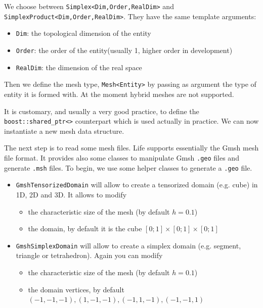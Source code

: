 \documentclass[11pt]{article}
\begin{document}
We choose between \lstinline!Simplex<Dim,Order,RealDim>!  and
\lstinline!SimplexProduct<Dim,Order,RealDim>!. They have the same
template arguments:
\begin{itemize}
\item \lstinline!Dim!: the topological dimension of the entity
\item \lstinline!Order!: the order of the entity(usually 1, higher order in development)
\item \lstinline!RealDim!: the dimension of the real space
\end{itemize}




Then we define the mesh type, \lstinline!Mesh<Entity>! by passing as
argument the type of entity it is formed with. At the moment hybrid
meshes are not supported.



It is customary, and usually a very good practice, to define the
\lstinline!boost::shared_ptr<>!  counterpart which is used actually in
practice. We can now instantiate a new mesh data structure.



The next step is to read some mesh files. Life supports essentially
the Gmsh mesh file format. It provides also some classes to manipulate
Gmsh \lstinline!.geo! files and generate \lstinline!.msh! files. To
begin, we use some helper classes to generate a \lstinline!.geo! file.

\begin{itemize}
\item \lstinline!GmshTensorizedDomain! will allow to create a
  tensorized domain (e.g. cube) in 1D, 2D and 3D. It allows to modify
  \begin{itemize}
  \item the characteristic size of the mesh (by default $h=0.1$)
  \item the domain, by default it is the cube $[0;1]\times[0;1]\times[0;1]$
  \end{itemize}
\item \lstinline!GmshSimplexDomain! will allow to create a simplex
  domain (e.g. segment, triangle or tetrahedron). Again you can modify
  \begin{itemize}
  \item the characteristic size of the mesh (by default $h=0.1$)
  \item the domain vertices, by default $(-1,-1,-1), (1,-1,-1), (-1,1,-1), (-1,-1,1)$
  \end{itemize}
\end{itemize}
\end{document}
